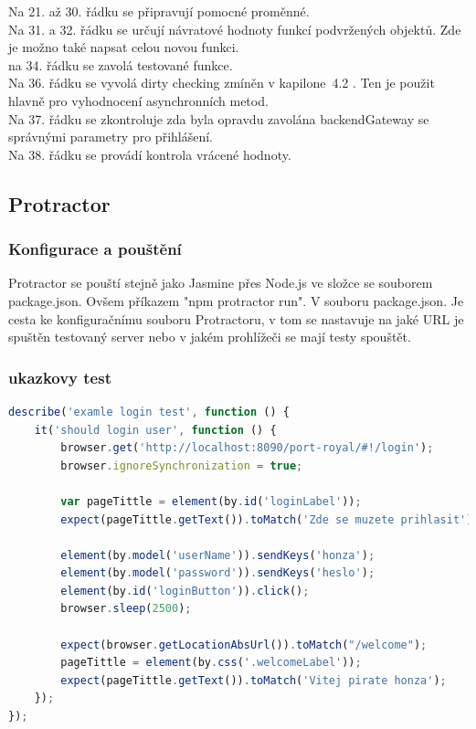 \documentclass[czech,master,public,dept460,male,cpdeclaration,twoside]{diploma}
\begin{document}
Na 21. až 30. řádku se připravují pomocné proměnné.\\
Na 31. a 32. řádku se určují návratové hodnoty funkcí podvržených objektů. Zde je možno také napsat celou novou funkci.\\
na 34. řádku se zavolá testované funkce.\\
Na 36. řádku se vyvolá dirty checking zmíněn v kapilone~4.2 . Ten je použit hlavně pro vyhodnocení asynchronních metod.\\
Na 37. řádku se zkontroluje zda byla opravdu zavolána backendGateway se správnými parametry pro přihlášení.\\
Na 38. řádku se provádí kontrola vrácené hodnoty.\\

\subsection{Protractor}
\subsubsection{Konfigurace a pouštění}
Protractor se pouští stejně jako Jasmine přes Node.js ve složce se souborem package.json. Ovšem příkazem "npm protractor run". V souboru package.json. Je cesta ke konfiguračnímu souboru Protractoru, v tom se nastavuje na jaké URL je spuštěn testovaný server nebo v jakém prohlížeči se mají testy spouštět. 

\subsubsection{ukazkovy test}
\begin{lstlisting}[language=JavaScript, caption=Ukázkový Protractor test]
describe('examle login test', function () {
    it('should login user', function () {
        browser.get('http://localhost:8090/port-royal/#!/login');
        browser.ignoreSynchronization = true;

        var pageTittle = element(by.id('loginLabel'));
        expect(pageTittle.getText()).toMatch('Zde se muzete prihlasit');

        element(by.model('userName')).sendKeys('honza');
        element(by.model('password')).sendKeys('heslo');
        element(by.id('loginButton')).click();
        browser.sleep(2500);

        expect(browser.getLocationAbsUrl()).toMatch("/welcome");
        pageTittle = element(by.css('.welcomeLabel'));
        expect(pageTittle.getText()).toMatch('Vitej pirate honza');
    });
});
\end{lstlisting}
\end{document}
